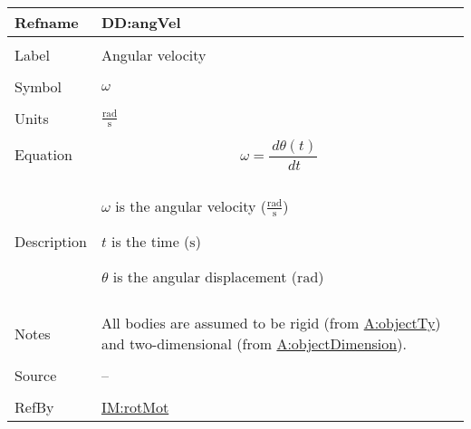 \documentclass[12pt]{article}
\begin{document}
\vspace{\baselineskip}
\noindent
\begin{minipage}{\textwidth}
\begin{tabular}{>{\raggedright}p{}>{\raggedright\arraybackslash}p{}}
\toprule \textbf{Refname} & \textbf{DD:angVel}
\label{DD:angVel}
\\ \midrule \\
Label & Angular velocity
        
\\ \midrule \\
Symbol & $ω$
         
\\ \midrule \\
Units & $\frac{\text{rad}}{\text{s}}$
        
\\ \midrule \\
Equation & \begin{displaymath}
           ω=\frac{\,dθ\left(t\right)}{\,dt}
           \end{displaymath}
\\ \midrule \\
Description & \begin{symbDescription}
              \item{$ω$ is the angular velocity ($\frac{\text{rad}}{\text{s}}$)}
              \item{$t$ is the time (${\text{s}}$)}
              \item{$θ$ is the angular displacement (${\text{rad}}$)}
              \end{symbDescription}
\\ \midrule \\
Notes & All bodies are assumed to be rigid (from \hyperref[assumpOT]{A:objectTy}) and two-dimensional (from \hyperref[assumpOD]{A:objectDimension}).
        
\\ \midrule \\
Source & --
         
\\ \midrule \\
RefBy & \hyperref[IM:rotMot]{IM:rotMot}
        
\\ \bottomrule
\end{tabular}
\end{minipage}
\end{document}
